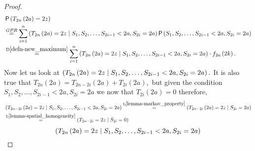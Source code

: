 \begin{proof}
  \[
    \begin{split}
      &\pr \left(T_{2n}\left(2a\right)=2z\right)\\
      &\gpr \suma \left(T_{2n}\left(2a\right)=2z \Mid S_1,S_2, \ldots, S_{2i-1}<2a, S_{2i}=2a\right)\pr\left(S_1,S_2, \ldots, S_{2i-1}<2a, S_{2i}=2a\right)\\
      &\overset{\text{D}\ref{defn-new_maximum}}{=}\suma \left(T_{2n}\left(2a\right)=2z \Mid S_1,S_2, \ldots, S_{2i-1}<2a, S_{2i}=2a\right)\cdot f_{2a}\left(2k\right).
    \end{split}
  \]
  Now let us look at $\left(T_{2n}\left(2a\right)=2z \;\middle\vert\; S_1,S_2, \ldots, S_{2i-1}<2a, S_{2i}=2a\right).$
  It is also true that
  $T_{2n}\left(2a\right)=T_{2n-2i}\left(2a\right)+T_{2i}\left(2a\right),$
  but given the condition $S_1,S_2, \ldots, S_{2i-1}<2a, S_{2i}=2a$
  we now that $T_{2i}\left(2a\right)=0$ therefore,
  \[
    \begin{split}
        & \left(T_{2n-2i}\left(2a\right)=2z \;\middle\vert\; S_1,S_2, \ldots, S_{2i-1}<2a, S_{2i}=2a\right)
        \overset{\text{L}\ref{lemma-markov_property}}{=} \left(T_{2n-2i}\left(2a\right)=2z \;\middle\vert\; S_{2i}=2a\right)\\
        & \overset{\text{L}\ref{lemma-spatial_homogeneity}}{=} \left(T_{2n-2i}=2z \;\middle\vert\; S_{2i}=0\right)
    \end{split}
  \]
  \[
  \left(T_{2n}\left(2a\right)=2z \;\middle\vert\; S_1,S_2, \ldots, S_{2i-1}<2a, S_{2i}=2a\right)
  \]
\end{proof}

